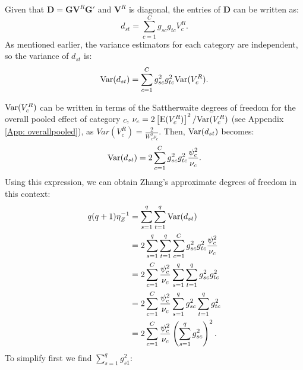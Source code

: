 Given that $\bm{D} = \bm{G} \bm{V}^R \bm{G}'$ and $\bm{V}^R$ is diagonal, the entries of $\bm{D}$ can be written as:
\begin{equation}
    d_{st} = \sum_{c=1}^C g_{sc} g_{tc} V^R_c.
    \nonumber
\end{equation}
As mentioned earlier, the variance estimators for each category are independent, so the variance of $d_{st}$ is:
\begin{equation}
    {\text{Var}}(d_{st}) = \sum_{c=1}^C g_{sc}^2 g_{tc}^2 {\text{Var}}(V^R_c).
    \nonumber
\end{equation}

${\text{Var}}(V^R_c)$ can be written in terms of the Sattherwaite degrees of freedom for the overall pooled effect of category $c$, $\nu_c = 2\left[{\text{E}}(V^R_c)\right]^2 / {\text{Var}}(V^R_c)$ (see Appendix \ref{App: overallpooled}), as $Var(V_c^R) = \frac{2}{W^2_c\nu_c}$. Then, ${\text{Var}}(d_{st})$ becomes: 
\begin{equation}
    {\text{Var}}(d_{st}) = 2 \sum_{c=1}^C g_{sc}^2 g_{tc}^2 \frac{\psi_c^2}{\nu_c}.
    \nonumber
\end{equation}
Using this expression, we can obtain Zhang's approximate degrees of freedom in this context:
\begin{equation}
    \begin{aligned}
q(q + 1)\eta_Z^{-1} &= \sum_{s=1}^q \sum_{t = 1}^q {\text{Var}}(d_{st}) \\ 
&= 2\sum_{s=1}^q \sum_{t = 1}^q \sum_{c=1}^C g_{sc}^2 g_{tc}^2 \frac{\psi_c^2}{\nu_c} \\
&= 2 \sum_{c=1}^C \frac{\psi_c^2}{\nu_c} \sum_{s=1}^q \sum_{t=1}^q g_{sc}^2 g_{tc}^2 \\
&= 2 \sum_{c=1}^C \frac{\psi_c^2}{\nu_c} \sum_{s=1}^q g_{sc}^2 \sum_{t=1}^q g_{tc}^2 \\
&= 2\sum_{c=1}^C \frac{\psi_c^2}{\nu_c} \left(\sum_{s=1}^q g_{sc}^2\right)^2.
\end{aligned}
\nonumber
\end{equation}
To simplify first we find $\sum_{s=1}^q g_{s1}^2$:
